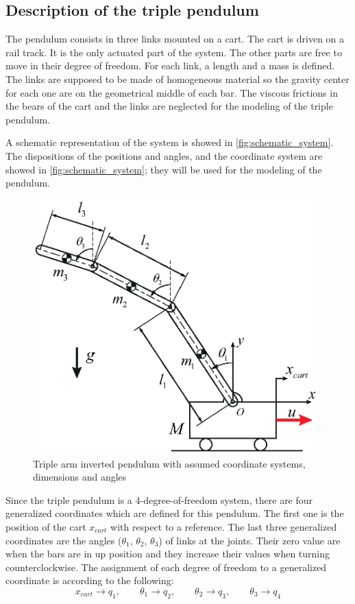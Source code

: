 \documentclass[a4paper,12pt]{article}
\begin{document}
\subsection{Description of the triple pendulum}
The pendulum consists in three links mounted on a cart. The cart is driven on a rail track. It is the only actuated part of the system. The other parts are free to move in their degree of freedom. For each link, a length and a mass is defined. The links are supposed to be made of homogeneous material so the gravity center for each one are on the geometrical middle of each bar. The viscous frictions in the bears of the cart and the links are neglected for the modeling of the triple pendulum.

A schematic representation of the system is showed in \autoref{fig:schematic_system}. The dispositions of the positions and angles, and the coordinate system are showed in \autoref{fig:schematic_system}; they will be used for the modeling of the pendulum.
\begin{figure}[ht]
	\centering
	\includegraphics[width=11cm]{illustrations/schematic_system.eps}
	\caption{Triple arm inverted pendulum with assumed coordinate systems, dimensions and angles}
	\label{fig:schematic_system}
\end{figure}

Since the triple pendulum is a 4-degree-of-freedom system, there are four generalized coordinates which are defined for this pendulum. The first one is the position of the cart $x_{cart}$ with respect to a reference. The last three generalized coordinates are the angles ($\theta_1$, $\theta_2$, $\theta_3$) of links at the joints. Their zero value are when the bars are in up position and they increase their values when turning counterclockwise. The assignment of each degree of freedom to a generalized coordinate is according to the following:
\[
	x_{cart}\to q_1, \qquad \theta_1\to q_2, \qquad \theta_2\to q_3, \qquad \theta_3\to q_4
\]
\end{document}
